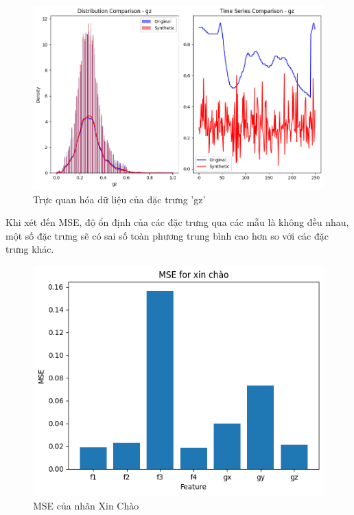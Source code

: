 \begin{figure}[H]
    \centering
    \includegraphics[width=1\textwidth]{Images/Improvement results/TimeGAN_gz.png}
    \caption{Trực quan hóa dữ liệu của đặc trưng 'gz'}
    \label{fig:timegan_data_gz}
\end{figure}

Khi xét đến MSE, độ ổn định của các đặc trưng qua các mẫu là không đều nhau, một số đặc trưng sẽ có sai số toàn phương trung bình cao hơn so với các đặc trưng khác.

\begin{figure}[H]
    \centering
    \includegraphics[width=1\textwidth]{Images/Improvement results/MSE_xinchao.png}
    \caption{MSE của nhãn Xin Chào}
    \label{fig:timegan_mse}
\end{figure}

